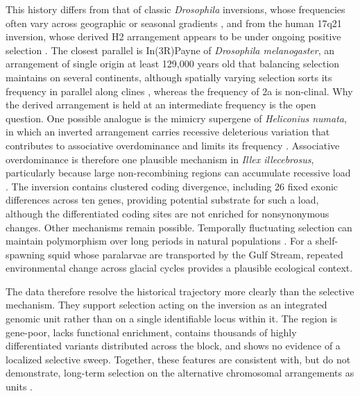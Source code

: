 \documentclass[11pt]{article}
\newcommand{\illex}{\textit{Illex illecebrosus}}
\begin{document}
This history differs from that of classic \textit{Drosophila} inversions, whose frequencies often vary across geographic or seasonal gradients \citep{corbettdetig2012,kapun2019}, and from the human 17q21 inversion, whose derived H2 arrangement appears to be under ongoing positive selection \citep{stefansson2005}. The closest parallel is In(3R)Payne of \textit{Drosophila melanogaster}, an arrangement of single origin at least 129{,}000 years old that balancing selection maintains on several continents, although spatially varying selection sorts its frequency in parallel along clines \citep{kapun2023}, whereas the frequency of 2a is non-clinal. Why the derived arrangement is held at an intermediate frequency is the open question. One possible analogue is the mimicry supergene of \textit{Heliconius numata}, in which an inverted arrangement carries recessive deleterious variation that contributes to associative overdominance and limits its frequency \citep{jay2021}. Associative overdominance is therefore one plausible mechanism in \illex{}, particularly because large non-recombining regions can accumulate recessive load \citep{zhao2016,gilbert2020,berdan2021}. The inversion contains clustered coding divergence, including 26 fixed exonic differences across ten genes, providing potential substrate for such a load, although the differentiated coding sites are not enriched for nonsynonymous changes. Other mechanisms remain possible. Temporally fluctuating selection can maintain polymorphism over long periods in natural populations \citep{wittmann2017,rudman2022}. For a shelf-spawning squid whose paralarvae are transported by the Gulf Stream, repeated environmental change across glacial cycles provides a plausible ecological context.

The data therefore resolve the historical trajectory more clearly than the selective mechanism. They support selection acting on the inversion as an integrated genomic unit rather than on a single identifiable locus within it. The region is gene-poor, lacks functional enrichment, contains thousands of highly differentiated variants distributed across the block, and shows no evidence of a localized selective sweep. Together, these features are consistent with, but do not demonstrate, long-term selection on the alternative chromosomal arrangements as units \citep{kirkpatrick2010,berdan2023}.
\end{document}
